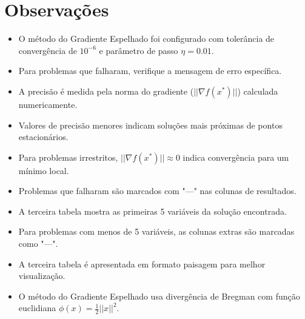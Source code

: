 \documentclass[12pt]{article}
\begin{document}
\section{Observações}

\begin{itemize}
\item O método do Gradiente Espelhado foi configurado com tolerância de convergência de $10^{-6}$ e parâmetro de passo $\eta = 0.01$.
\item Para problemas que falharam, verifique a mensagem de erro específica.
\item A precisão é medida pela norma do gradiente ($||\nabla f(x^*)||$) calculada numericamente.
\item Valores de precisão menores indicam soluções mais próximas de pontos estacionários.
\item Para problemas irrestritos, $||\nabla f(x^*)|| \approx 0$ indica convergência para um mínimo local.
\item Problemas que falharam são marcados com "---" nas colunas de resultados.
\item A terceira tabela mostra as primeiras 5 variáveis da solução encontrada.
\item Para problemas com menos de 5 variáveis, as colunas extras são marcadas como "---".
\item A terceira tabela é apresentada em formato paisagem para melhor visualização.
\item O método do Gradiente Espelhado usa divergência de Bregman com função euclidiana $\phi(x) = \frac{1}{2}||x||^2$.
\end{itemize}
\end{document}
